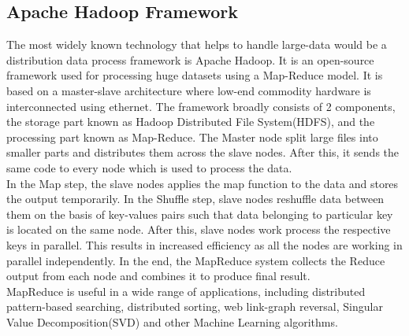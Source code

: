\documentclass[sigconf]{acmart}
\begin{document}
\subsection{Apache Hadoop Framework}
The most widely known technology that helps to handle large-data would be a distribution data process framework is Apache Hadoop. It is an open-source framework used for processing huge datasets using a Map-Reduce model. It is based on a master-slave architecture where low-end commodity hardware is interconnected using ethernet. The framework broadly consists of 2 components, the storage part known as Hadoop Distributed File System(HDFS), and the processing part known as Map-Reduce.\cite{hadoopwiki} The Master node split large files into smaller parts and distributes them across the slave nodes. After this, it sends the same code to every node which is used to process the data.\\
In the Map step, the slave nodes applies the map function to the data and stores the output temporarily. In the Shuffle step, slave nodes reshuffle data between them on the basis of key-values pairs such that data belonging to particular key is located on the same node. After this, slave nodes work process the respective keys in parallel. This results in increased efficiency as all the nodes are working in parallel independently. In the end, the MapReduce system collects the Reduce output from each node and combines it to produce final result.\\
MapReduce is useful in a wide range of applications, including distributed pattern-based searching, distributed sorting, web link-graph reversal, Singular Value Decomposition(SVD) and other Machine Learning algorithms.\cite{hadoopwiki}
\end{document}
